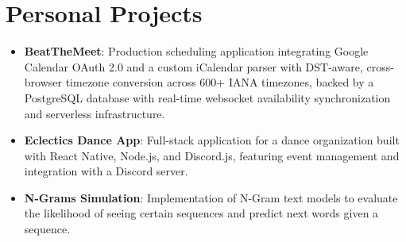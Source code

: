 \documentclass[letterpaper,11pt]{article}
\newcommand{\resumeItem}[2]{
  \item\small{
    \textbf{#1}{: #2 \vspace{-2pt}}
  }
}
\newcommand{\resumeSubItem}[2]{\resumeItem{#1}{#2}\vspace{-4pt}}
\newcommand{\resumeSubHeadingListStart}{\begin{itemize}[leftmargin=*]}
\newcommand{\resumeSubHeadingListEnd}{\end{itemize}}
\begin{document}
\section{Personal Projects}
  \resumeSubHeadingListStart
    \resumeSubItem{BeatTheMeet}
      {Production scheduling application integrating Google Calendar OAuth 2.0 and a custom iCalendar parser with DST-aware, cross-browser timezone conversion across 600+ IANA timezones, backed by a PostgreSQL database with real-time websocket availability synchronization and serverless infrastructure.}
    \resumeSubItem{Eclectics Dance App}
      {Full-stack application for a dance organization built with React Native, Node.js, and Discord.js, featuring event management and integration with a Discord server.}
    \resumeSubItem{N-Grams Simulation}
      {Implementation of N-Gram text models to evaluate the likelihood of seeing certain sequences and predict next words given a sequence.}
  \resumeSubHeadingListEnd
\end{document}
